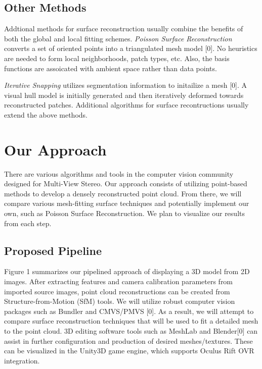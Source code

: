 \documentclass[10pt,twocolumn,letterpaper]{article}
\begin{document}
\subsection{Other Methods}
Addtional methods for surface reconstruction usually combine the benefits of both the global and local fitting schemes.  \textit{Poisson Surface Reconstruction} converts a set of oriented points into a triangulated mesh model [0].  No heuristics are needed to form local neighborhoods, patch types, etc.  Also, the basis functions are assoicated with ambient space rather than data points.

\textit{Iterative Snapping} utilizes segmentation information to initailize a mesh [0].  A visual hull model is initially generated and then iteratively deformed towards reconstructed patches.  Additional algorithms for surface recontructions usually extend the above methods.     


\section{Our Approach}
There are various algorithms and tools in the computer vision community designed for Multi-View Stereo.  Our approach consists of utilizing point-based methods to develop a densely reconstructed point cloud.  From there, we will compare various mesh-fitting surface techniques and potentially implement our own, such as Poisson Surface Reconstruction.  We plan to visualize our results from each step.

\subsection{Proposed Pipeline}
Figure 1 summarizes our pipelined approach of displaying a 3D model from 2D images.  After extracting features and camera calibration parameters from imported source images, point cloud reconstructions can be created from Structure-from-Motion (SfM) tools.  We will utilize robust computer vision packages such as Bundler and CMVS/PMVS [0].  As a result, we will attempt to compare surface reconstruction techniques that will be used to fit a detailed mesh to the point cloud.  3D editing software tools such as MeshLab and Blender[0] can assist in further configuration and production of desired meshes/textures.  These can be visualized in the Unity3D game engine, which supports Oculus Rift OVR integration.
\end{document}
